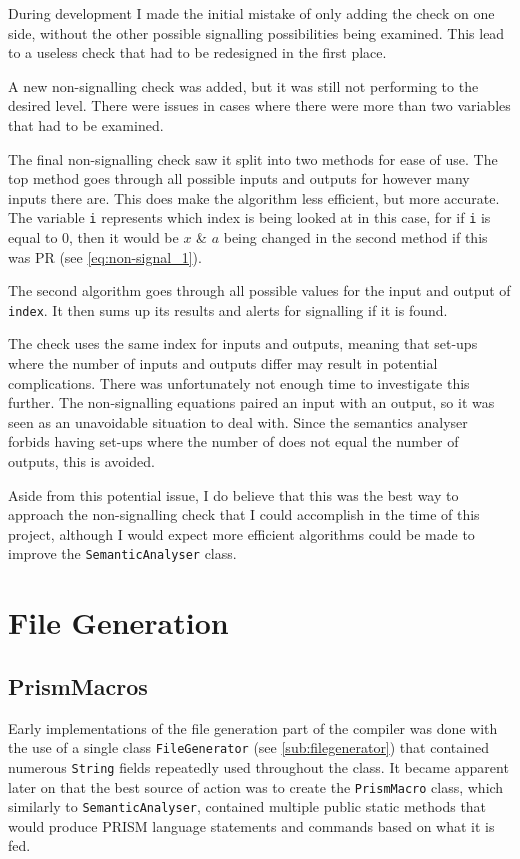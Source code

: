 \documentclass[report.tex]{subfiles}
\begin{document}
During development I made the initial mistake of only adding the check on one
side, without the other possible signalling possibilities being examined. This
lead to a useless check that had to be redesigned in the first place.

A new non-signalling check was added, but it was still not performing to the
desired level. There were issues in cases where there were more than two
variables that had to be examined.



The final non-signalling check saw it split into two methods for ease of use.
The top method goes through all possible inputs and outputs for however many
inputs there are. This does make the algorithm less efficient, but more
accurate. The variable \texttt{i} represents which index is being looked at
in this case, for if \texttt{i} is equal to 0, then it would be \(x\) \& \(a\)
being changed in the second method if this was PR (see \ref{eq:non-signal_1}).

The second algorithm goes through all possible values for the input and output
of \texttt{index}. It then sums up its results and alerts for signalling if 
it is found.

The check uses the same index for inputs and outputs, meaning that set-ups
where the number of inputs and outputs differ may result in potential
complications. There was unfortunately not enough time to investigate this
further. The non-signalling equations paired an input with an output, so it was
seen as an unavoidable situation to deal with. Since the semantics analyser
forbids having set-ups where the number of does not equal the number of outputs,
this is avoided.

Aside from this potential issue, I do believe that this was the best way to
approach the non-signalling check that I could accomplish in the time of this
project, although I would expect more efficient algorithms could be made to
improve the \texttt{SemanticAnalyser} class.

\section{File Generation} %
\label{sec:file_generation}
\subsection{PrismMacros} %
\label{sub:prismmacros}
Early implementations of the file generation part of the compiler was done with
the use of a single class \texttt{FileGenerator} (see \ref{sub:filegenerator})
that contained numerous \texttt{String} fields repeatedly used throughout the
class. It became apparent later on that the best source of action was to create
the \texttt{PrismMacro} class, which similarly to \texttt{SemanticAnalyser},
contained multiple public static methods that would produce PRISM language
statements and commands based on what it is fed.
\end{document}
